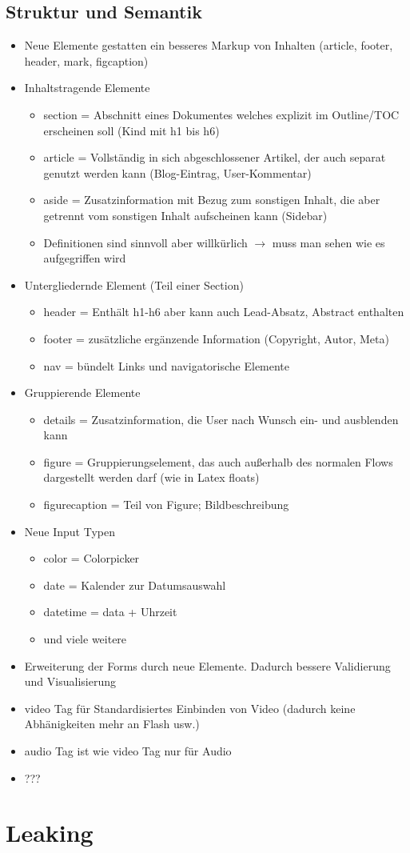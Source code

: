 \documentclass{article} %
\begin{document}
	\subsection{Struktur und Semantik}
	\begin{itemize}
		\item Neue Elemente gestatten ein besseres Markup von Inhalten (article, footer, header, mark, figcaption)
		\item Inhaltstragende Elemente
		\begin{itemize}
			\item section = Abschnitt eines Dokumentes welches explizit im Outline/TOC erscheinen soll (Kind mit h1 bis h6)
			\item article = Vollständig in sich abgeschlossener Artikel, der auch separat genutzt werden kann (Blog-Eintrag, User-Kommentar)
			\item aside = Zusatzinformation mit Bezug zum sonstigen Inhalt, die aber getrennt vom sonstigen Inhalt aufscheinen kann (Sidebar)
			\item Definitionen sind sinnvoll aber willkürlich $\rightarrow$ muss man sehen wie es aufgegriffen wird
		\end{itemize}
		\item Untergliedernde Element (Teil einer Section)
		\begin{itemize}
			\item header = Enthält h1-h6 aber kann auch Lead-Absatz, Abstract enthalten
			\item footer = zusätzliche ergänzende Information (Copyright, Autor, Meta)
			\item nav = bündelt Links und navigatorische Elemente
		\end{itemize}
		\item Gruppierende Elemente
		\begin{itemize}
			\item details = Zusatzinformation, die User nach Wunsch ein- und ausblenden kann
			\item figure = Gruppierungselement, das auch außerhalb des normalen Flows dargestellt werden darf (wie in Latex floats)
			\item figurecaption = Teil von Figure; Bildbeschreibung
		\end{itemize}
		\item Neue Input Typen
		\begin{itemize}
			\item color = Colorpicker
			\item date = Kalender zur Datumsauswahl
			\item datetime = data + Uhrzeit
			\item und viele weitere
		\end{itemize}
		\item Erweiterung der Forms durch neue Elemente. Dadurch bessere Validierung und Visualisierung
		\item video Tag für Standardisiertes Einbinden von Video (dadurch keine Abhänigkeiten mehr an Flash usw.)
		\item audio Tag ist wie video Tag nur für Audio
		\item ???
	\end{itemize}
\section{Leaking}
\end{document}

